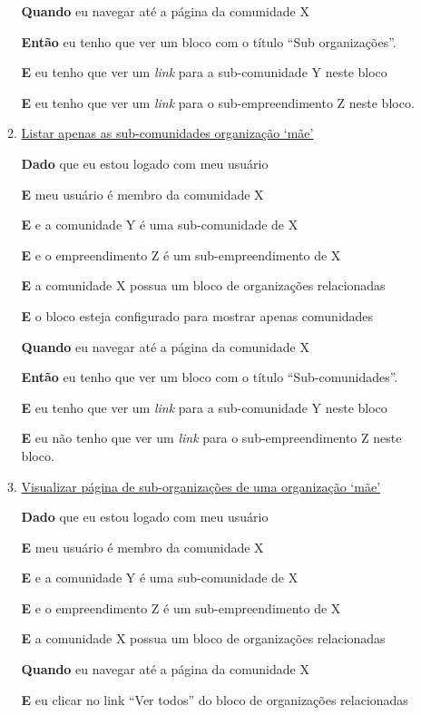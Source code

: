 \begin{enumerate}
\begin{enumerate}
\textbf{Quando} eu navegar até a página da comunidade X

\textbf{Então} eu tenho que ver um bloco com o título ``Sub organizações''.

\textbf{E} eu tenho que ver um \textit{link} para a sub-comunidade Y neste
bloco

\textbf{E} eu tenho que ver um \textit{link} para o sub-empreendimento Z neste
bloco.

\item \underline{Listar apenas as sub-comunidades organização `mãe'}

\textbf{Dado} que eu estou logado com meu usuário

\textbf{E} meu usuário é membro da comunidade X

\textbf{E} e a comunidade Y é uma sub-comunidade de X

\textbf{E} e o empreendimento Z é um sub-empreendimento de X

\textbf{E} a comunidade X possua um bloco de organizações relacionadas

\textbf{E} o bloco esteja configurado para mostrar apenas comunidades

\textbf{Quando} eu navegar até a página da comunidade X

\textbf{Então} eu tenho que ver um bloco com o título ``Sub-comunidades''.

\textbf{E} eu tenho que ver um \textit{link} para a sub-comunidade Y neste
bloco

\textbf{E} eu não tenho que ver um \textit{link} para o sub-empreendimento Z
neste bloco.

\item \underline{Visualizar página de sub-organizações de uma organização `mãe'}

\textbf{Dado} que eu estou logado com meu usuário

\textbf{E} meu usuário é membro da comunidade X

\textbf{E} e a comunidade Y é uma sub-comunidade de X

\textbf{E} e o empreendimento Z é um sub-empreendimento de X

\textbf{E} a comunidade X possua um bloco de organizações relacionadas

\textbf{Quando} eu navegar até a página da comunidade X

\textbf{E} eu clicar no link ``Ver todos'' do bloco de organizações relacionadas


\end{enumerate}
\end{enumerate}
